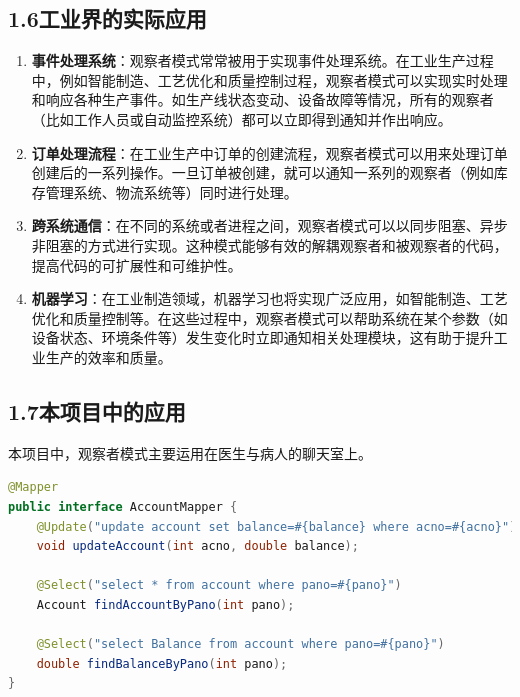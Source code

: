 \documentclass[24pt,a4paper]{article}%
\begin{document}
\subsection*{\songti 1.6工业界的实际应用}
\begin{enumerate}
    \item \textbf{事件处理系统}：观察者模式常常被用于实现事件处理系统。在工业生产过程中，例如智能制造、工艺优化和质量控制过程，观察者模式可以实现实时处理和响应各种生产事件。如生产线状态变动、设备故障等情况，所有的观察者（比如工作人员或自动监控系统）都可以立即得到通知并作出响应。
    \item \textbf{订单处理流程}：在工业生产中订单的创建流程，观察者模式可以用来处理订单创建后的一系列操作。一旦订单被创建，就可以通知一系列的观察者（例如库存管理系统、物流系统等）同时进行处理。
    \item \textbf{跨系统通信}：在不同的系统或者进程之间，观察者模式可以以同步阻塞、异步非阻塞的方式进行实现。这种模式能够有效的解耦观察者和被观察者的代码，提高代码的可扩展性和可维护性。
    \item \textbf{机器学习}：在工业制造领域，机器学习也将实现广泛应用，如智能制造、工艺优化和质量控制等。在这些过程中，观察者模式可以帮助系统在某个参数（如设备状态、环境条件等）发生变化时立即通知相关处理模块，这有助于提升工业生产的效率和质量。
\end{enumerate}

\subsection*{\songti 1.7本项目中的应用}
本项目中，观察者模式主要运用在医生与病人的聊天室上。

\begin{lstlisting}[language=Java]
@Mapper
public interface AccountMapper {
    @Update("update account set balance=#{balance} where acno=#{acno}")
    void updateAccount(int acno, double balance);
    
    @Select("select * from account where pano=#{pano}")
    Account findAccountByPano(int pano);
    
    @Select("select Balance from account where pano=#{pano}")
    double findBalanceByPano(int pano);
}
\end{lstlisting}

\newpage
\end{document}
